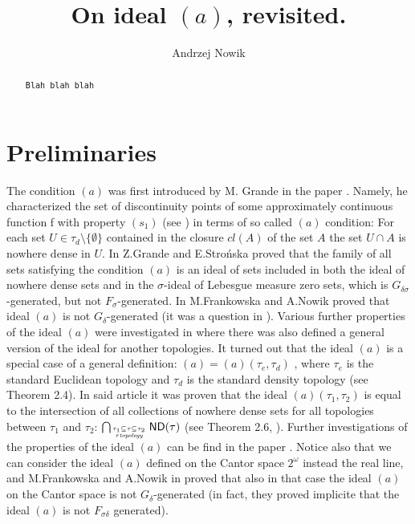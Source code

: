 \documentclass[12pt]{amsart}
\author{Andrzej Nowik}
\theoremstyle{plain}
\theoremstyle{definition}
\theoremstyle{remark}
\newcommand{\cl}{\mathit{cl}}
\newcommand{\dummy}{{\tt Blah blah blah}}
\newcommand{\aideal}{\mathit{(a)}}
\newcommand{\ND}{\mathsf{ND}}
\begin{document}
\title[
On ideal $(a)$, revisited.
]{
On ideal $(a)$, revisited.
}

\begin{abstract}
\dummy
\end{abstract}

\maketitle

\section{Preliminaries}
\label{section:preliminaries}
The condition $(a)$ was first introduced by M. Grande 
in the paper
\cite{MarcinGrande}. Namely, he characterized the set of discontinuity points of some approximately continuous function f with property
$(s_1)$ (see \cite[Theorem 1]{MarcinGrande}) in terms of so called $(a)$ condition:
For each set $U\in\tau_d\setminus\lbrace\emptyset\rbrace$ contained in the closure $\cl(A)$ of the set $A$ the
set $U \cap A$ is nowhere dense in $U$.
In 
\cite{GS} Z.Grande and E.Stro\'nska proved that the family of all sets satisfying
the condition $(a)$ is an ideal of sets included in both the ideal of
nowhere dense sets and in the $\sigma$-ideal of Lebesgue measure zero sets, 
which is $G_{\delta\sigma}$-generated, but not 
$F_{\sigma}$-generated. 
In \cite{FN2}
M.Frankowska and A.Nowik proved that ideal $(a)$ is not $G_{\delta}$-generated
(it was a question in \cite{GS}).
Various further properties of the ideal $(a)$ were investigated in \cite{N}
where there was also defined a general version of the ideal for another
topologies. 
It turned out that the ideal $(a)$ is a special case of
a general definition: $\aideal = \aideal(\tau_e, \tau_d)$ 
, where $\tau_e$ is the standard Euclidean topology and 
$\tau_d$ is the standard density topology (see \cite{N} Theorem 2.4).
In said article it was proven that the ideal $\aideal(\tau_1, \tau_2)$
is equal to the intersection of all collections of nowhere dense sets
for all topologies between $\tau_1$ and $\tau_2$:
$\bigcap_{\tau_1 \subseteq \tau \subseteq \tau_2 \atop \tau \hbox{\tiny \it
topology}} \ND(\tau)$ (see Theorem 2.6, \cite{N}).
Further investigations of the properties of the ideal $(a)$ can be find in the paper  
\cite{FG}.
Notice also that we can consider the ideal $(a)$ defined on the Cantor
space $2^{\omega}$ instead the real line, and 
M.Frankowska and A.Nowik in \cite{FN1} proved that also in that case
the ideal $\aideal$ on the Cantor space is 
not $G_{\delta}$-generated (in fact, they proved implicite that the ideal $(a)$ is not
$F_{\sigma\delta}$ generated).
\end{document}
